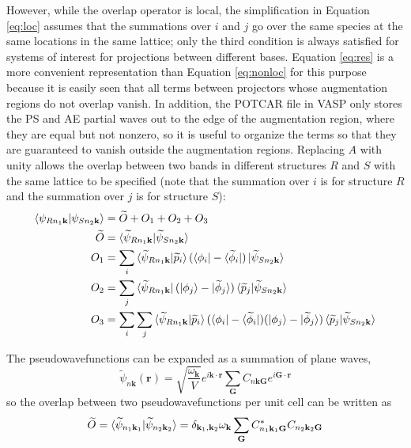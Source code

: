 \documentclass[12pt]{article}
\begin{document}
However, while the overlap operator is local, the simplification in Equation \ref{eq:loc} assumes that
the summations over $i$ and $j$ go over the same species at the same locations in the same lattice;
only the third condition is always satisfied for systems of interest for projections between different
bases. Equation \ref{eq:res} is a more convenient representation than Equation \ref{eq:nonloc} for this
purpose because it is easily seen that all terms between projectors whose augmentation regions do not
overlap vanish. In addition, the POTCAR file in VASP only stores the PS and AE partial waves out to the
edge of the augmentation region, where they are equal but not nonzero, so it is useful to organize the terms
so that they are guaranteed to vanish outside the augmentation regions. Replacing $A$ with unity
allows the overlap between two bands
in different structures $R$ and $S$ with the same lattice to be specified (note that the
summation over $i$ is for structure $R$ and the summation over $j$ is for structure $S$):
\begin{equation}
\begin{split}
\braket{\psi_{Rn_1\mathbf{k}}|\psi_{Sn_2\mathbf{k}}} & =\widetilde{O}+O_1+O_2+O_3\\
\widetilde{O} & =\braket{\widetilde{\psi}_{Rn_1\mathbf{k}}|\widetilde{\psi}_{Sn_2\mathbf{k}}}\\
O_1 & =\sum_i\braket{\widetilde{\psi}_{Rn_1\mathbf{k}}|\widetilde{p}_i}(\bra{\phi_i}-\bra{\widetilde{\phi}_i})
\ket{\widetilde{\psi}_{Sn_2\mathbf{k}}}\\
O_2 & =\sum_j\bra{\widetilde{\psi}_{Rn_1\mathbf{k}}}(\ket{\phi_j}-\ket{\widetilde{\phi}_j})
\braket{\widetilde{p}_j|\widetilde{\psi}_{Sn_2\mathbf{k}}}\\
O_3 & =\sum_i\sum_j\braket{\widetilde{\psi}_{Rn_1\mathbf{k}}|
\widetilde{p}_i}(\bra{\phi_i}-\bra{\widetilde{\phi}_i})
(\ket{\phi_j}-\ket{\widetilde{\phi}_j})\braket{\widetilde{p}_j|\widetilde{\psi}_{Sn_2\mathbf{k}}}
\end{split}
\label{eq:ov1}
\end{equation}

The pseudowavefunctions can be expanded as a summation of plane waves,
$$\widetilde{\psi}_{n\mathbf{k}}(\mathbf{r})=\sqrt{\frac{\omega_{\mathbf{k}}}{V}}
e^{i\mathbf{k}\cdot \mathbf{r}}\sum_{\mathbf{G}} C_{n\mathbf{k}\mathbf{G}}
e^{i\mathbf{G}\cdot \mathbf{r}}$$
so the overlap between two pseudowavefunctions per unit cell can be written as
$$\widetilde{O}=\braket{\widetilde{\psi}_{n_1\mathbf{k}_1}|\widetilde{\psi}_{n_2\mathbf{k}_2}}
=\delta_{\mathbf{k}_1,\mathbf{k}_2}
\omega_{\mathbf{k}} \sum_{\mathbf{G}} C^*_{n_1\mathbf{k}_1\mathbf{G}}C_{n_2\mathbf{k}_2\mathbf{G}}$$
\end{document}
